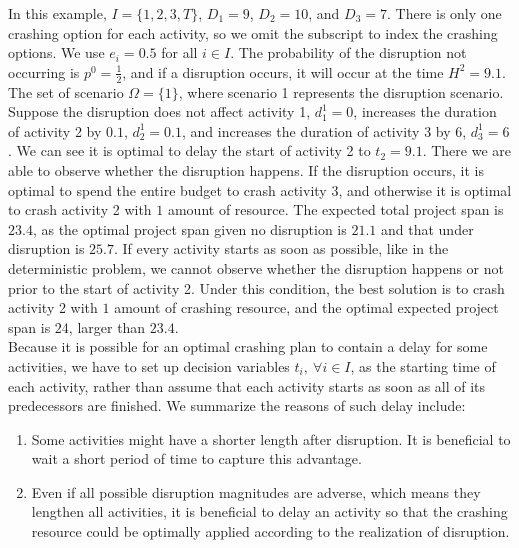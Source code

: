 \documentclass[11pt]{article}
\newcommand{\noi}{\noindent}
\begin{document}
	\noi In this example, \(I=\{1,2,3,T\}\), \(D_1=9\), \(D_2=10\), and \(D_3=7\). There is only one crashing option for each activity, so we omit the subscript to index the crashing options. We use \(e_i = 0.5\) for all \(i \in I\). The probability of the disruption not occurring is \(p^0=\frac{1}{2}\), and if a disruption occurs, it will occur at the time \(H^2 = 9.1\). The set of scenario \(\Omega = \{1\}\), where scenario 1 represents the disruption scenario. Suppose the disruption does not affect activity 1, \(d_1^1 = 0\), increases the duration of activity 2 by \(0.1\), \(d_2^1 = 0.1\), and increases the duration of activity 3 by \(6\), \(d_3^1 = 6\). We can see it is optimal to delay the start of activity 2 to \(t_2 = 9.1\). There we are able to observe whether the disruption happens. If the disruption occurs, it is optimal to spend the entire budget to crash activity 3, and otherwise it is optimal to crash activity 2 with \(1\) amount of resource. The expected total project span is \(23.4\), as the optimal project span given no disruption is \(21.1\) and that under disruption is \(25.7\). If every activity starts as soon as possible, like in the deterministic problem, we cannot observe whether the disruption happens or not prior to the start of activity 2. Under this condition, the best solution is to crash activity 2 with \(1\) amount of crashing resource, and the optimal expected project span is \(24\), larger than \(23.4\). \\
	\newline
	Because it is possible for an optimal crashing plan to contain a delay for some activities, we have to set up decision variables \(t_i,\ \forall i \in I\), as the starting time of each activity, rather than assume that each activity starts as soon as all of its predecessors are finished.  We summarize the reasons of such delay include:
		\begin{enumerate}
			\item Some activities might have a shorter length after disruption. It is beneficial to wait a short period of time to capture this advantage.
			\item Even if all possible disruption magnitudes are adverse, which means they lengthen all activities, it is beneficial to delay an activity so that the crashing resource could be optimally applied according to the realization of disruption.
		\end{enumerate}
\end{document}
